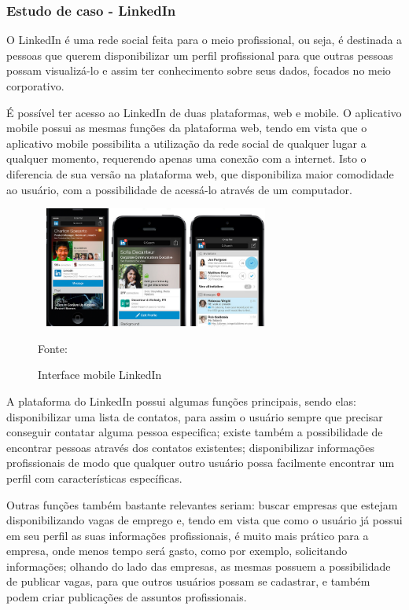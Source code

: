 \subsubsection{Estudo de caso - LinkedIn}

O LinkedIn é uma rede social feita para o meio profissional, ou seja, é destinada a pessoas que querem disponibilizar um perfil profissional para que outras pessoas possam visualizá-lo e assim ter conhecimento sobre seus dados, focados no meio corporativo.

É possível ter acesso ao LinkedIn de duas plataformas, web e mobile. O aplicativo mobile possui as mesmas funções da plataforma web, tendo em vista que o aplicativo mobile possibilita a utilização da rede social de qualquer lugar a qualquer momento, requerendo apenas uma conexão com a internet. Isto o diferencia de sua versão na plataforma web, que disponibiliza maior comodidade ao usuário, com a possibilidade de acessá-lo através de um computador. 

\begin{figure}[!h]
	\centering
	\caption{Interface mobile LinkedIn}
	\includegraphics[width=300px, height=150px]{./images/linkedinMobile.png}
	\par {Fonte: \cite{linkedin-b}}
\end{figure}
\newpage
A plataforma do LinkedIn possui algumas funções principais, sendo elas: disponibilizar uma lista de contatos, para assim o usuário sempre que precisar conseguir contatar alguma pessoa especifica; existe também a possibilidade de encontrar pessoas através dos contatos existentes; disponibilizar informações profissionais de modo que qualquer outro usuário possa facilmente encontrar um perfil com características específicas.

Outras funções também bastante relevantes seriam: buscar empresas que estejam disponibilizando vagas de emprego e, tendo em vista que como o usuário já possui em seu perfil as suas informações profissionais, é muito mais prático para a empresa, onde menos tempo será gasto, como por exemplo, solicitando informações; olhando do lado das empresas, as mesmas possuem a possibilidade de publicar vagas, para que outros usuários possam se cadastrar, e também podem criar publicações de assuntos profissionais.

